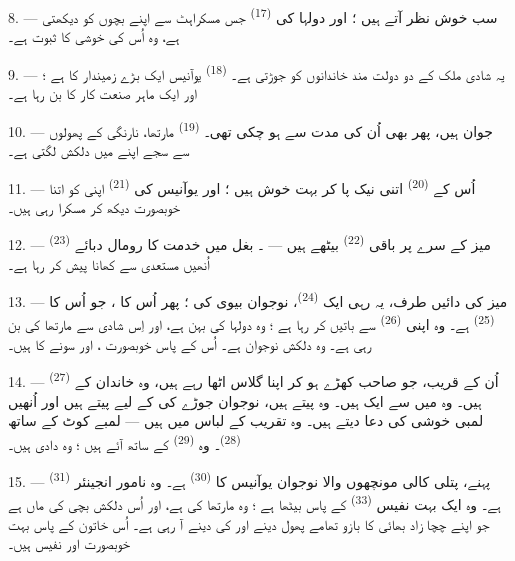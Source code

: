 \VUsaut{3.0mm}

8. --- سب خوش نظر آتے ہیں ؛ اور دولہا کی 
\textsuperscript{(17)} جس مسکراہٹ سے اپنے بچوں کو دیکھتی ہے، وہ اُس کی
خوشی کا ثبوت ہے۔

9. --- یہ شادی ملک کے دو دولت مند خاندانوں کو جوڑتی ہے۔
 \textsuperscript{(18)} یوآنیس ایک بڑے زمیندار کا
 ہے ؛ اور ایک ماہر صنعت کار کا  بن رہا
ہے۔

10. ---  جوان ہیں، پھر بھی اُن کی 
مدت سے ہو چکی تھی۔  \textsuperscript{(19)}
مارتھا، نارنگی کے پھولوں سے سجے اپنے  میں دلکش
لگتی ہے۔

11. --- اُس کے  \textsuperscript{(20)} اتنی نیک
 پا کر بہت خوش ہیں ؛ اور یوآنیس کی 
\textsuperscript{(21)} اپنی  کو اتنا خوبصورت دیکھ کر
مسکرا رہی ہیں۔

12. --- میز کے سرے پر باقی  \textsuperscript{(22)}
بیٹھے ہیں — ۔
بغل میں خدمت کا رومال دبائے 
\textsuperscript{(23)} اُنھیں مستعدی سے کھانا پیش کر رہا ہے۔

\VUsaut{3.0mm}

13. --- میز کی دائیں طرف، یہ رہی ایک 
\textsuperscript{(24)}، نوجوان بیوی کی  ؛ پھر اُس کا
، جو اُس کا 
\textsuperscript{(25)} ہے۔ وہ اپنی 
\textsuperscript{(26)} سے باتیں کر رہا ہے ؛ وہ دولہا کی بہن ہے، اور
اِس شادی سے مارتھا کی  بن رہی ہے۔ وہ دلکش نوجوان ہے۔ اُس
کے پاس خوبصورت ،  اور سونے کا
 ہیں۔

14. --- اُن کے قریب، جو صاحب کھڑے ہو کر اپنا گلاس اٹھا رہے ہیں، وہ
خاندان کے  \textsuperscript{(27)} ہیں۔ وہ  میں سے ایک ہیں۔ وہ  پیتے ہیں، نوجوان
جوڑے کی  کے لیے پیتے ہیں اور اُنھیں لمبی خوشی کی دعا
دیتے ہیں۔ وہ تقریب کے لباس میں ہیں — لمبے کوٹ کے ساتھ
 \textsuperscript{(28)}۔ وہ 
\textsuperscript{(29)} کے ساتھ آئے ہیں ؛ وہ دادی  ہیں۔

15. ---  \textsuperscript{(31)} پہنے، پتلی کالی
مونچھوں والا نوجوان یوآنیس کا  \textsuperscript{(30)}
ہے۔ وہ نامور انجینئر ہے۔ وہ ایک بہت نفیس 
\textsuperscript{(33)} کے پاس بیٹھا ہے ؛ وہ مارتھا کی  ہے، اور اُس دلکش بچی کی ماں ہے جو اپنے چچا زاد بھائی کا بازو
تھامے پھول دینے اور  کی  دینے آ رہی ہے۔
اُس خاتون کے پاس بہت خوبصورت  اور نفیس  ہیں۔

